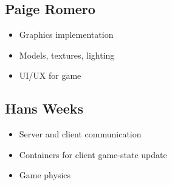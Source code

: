\documentclass[titlepage]{article}\usepackage[]{graphicx}\usepackage[]{color}
\begin{document}
\subsection{Paige Romero}\label{paige-romero}

\begin{itemize}
\itemsep1pt\parskip0pt
\item
  Graphics implementation
\item
  Models, textures, lighting
\item
  UI/UX for game
\end{itemize}

\subsection{Hans Weeks}\label{hans-weeks}

\begin{itemize}
\itemsep1pt\parskip0pt
\item
  Server and client communication
\item
  Containers for client game-state update
\item
  Game physics
\end{itemize}
\end{document}
